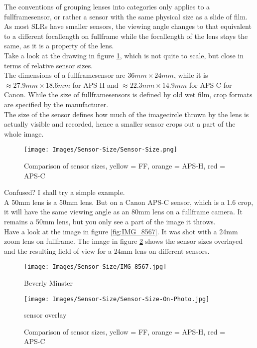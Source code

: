 The conventions of grouping lenses into categories only applies to a \gls{fullframesensor}, or rather a \gls{sensor} with the same physical size as a slide of film. As most \glspl{SLR} have smaller \glspl{sensor}, the viewing angle changes to that equivalent to a different \gls{focallength} on \gls{fullframe} while the \gls{focallength} of the lens stays the same, as it is a property of the lens.
\\[\baselineskip]
Take a look at the drawing in figure \ref{fig:Sensor-Size}, which is not quite to scale, but close in terms of relative \gls{sensor} sizes.
\\
The dimensions of a \gls{fullframesensor} are $36mm \times 24mm$, while it is $\approx 27.9mm \times 18.6mm$ for \gls{APS-H} and $\approx 22.3mm \times 14.9mm$ for \gls{APS-C} for Canon. While the size of \glspl{fullframesensor} is defined by old wet film, \gls{crop} formats are specified by the manufacturer.
\\
The size of the sensor defines how much of the \gls{imagecircle} thrown by the lens is actually visible and recorded, hence a smaller \gls{sensor} crops out a part of the whole image.

\begin{figure}[htbp]
	\centering
		\texttt{[image: Images/Sensor-Size/Sensor-Size.png]}
	\caption{Comparison of sensor sizes, yellow = \gls{FF}, orange = \gls{APS-H}, red = \gls{APS-C}}
	\label{fig:Sensor-Size}
\end{figure}

Confused? I shall try a simple example.
\\
A 50mm lens is a 50mm lens. But on a Canon \gls{APS-C} \gls{sensor}, which is a 1.6 \gls{crop}, it will have the same viewing angle as an 80mm lens on a \gls{fullframe} camera. It remains a 50mm lens, but you only see a part of the image it throws.
\\[\baselineskip]
Have a look at the image in figure \ref{fig:IMG_8567}. It was shot with a 24mm \gls{zoom} lens on \gls{fullframe}. The image in figure \ref{fig:Sensor-Size-On-Photo} shows the \gls{sensor} sizes overlayed and the resulting field of view for a 24mm lens on different sensors.

\begin{figure}[htb]
\centering
\begin{minipage}{.4\textwidth}
	\centering
		\texttt{[image: Images/Sensor-Size/IMG\_8567.jpg]}
	\caption{Beverly Minster}
	\label{fig:IMG_8567}
\end{minipage}
\begin{minipage}{.4\textwidth}
	\centering
		\texttt{[image: Images/Sensor-Size/Sensor-Size-On-Photo.jpg]}
	\caption{sensor overlay}
	\label{fig:Sensor-Size-On-Photo}
\end{minipage}
\caption*{Comparison of sensor sizes, yellow = \gls{FF}, orange = \gls{APS-H}, red = \gls{APS-C}}
\end{figure}

